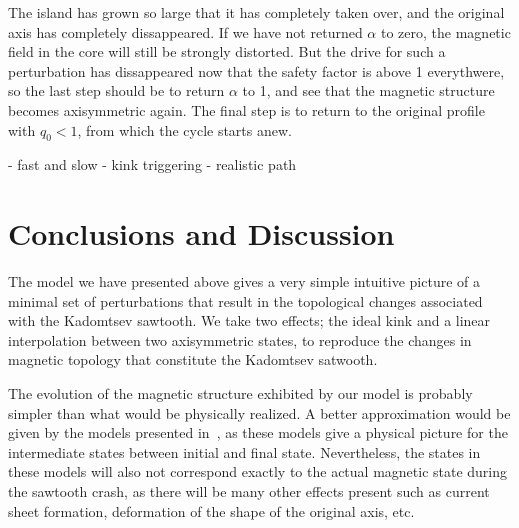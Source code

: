 \documentclass[%
superscriptaddress,
amsmath,amssymb,
aps,
pre,
floatfix,
]{revtex4-2}
\begin{document}
The island has grown so large that it has completely taken over, and the original axis has completely dissappeared. 
If we have not returned $\alpha$ to zero, the magnetic field in the core will still be strongly distorted. 
But the drive for such a perturbation has dissappeared now that the safety factor is above 1 everythwere, so the last step should be to return $\alpha$ to 1, and see that the magnetic structure becomes axisymmetric again. 
The final step is to return to the original profile with $q_0<1$, from which the cycle starts anew. 

- fast and slow
- kink triggering
- realistic path

\section*{Conclusions and Discussion}
The model we have presented above gives a very simple intuitive picture of a minimal set of perturbations that result in the topological changes associated with the Kadomtsev sawtooth. 
We take two effects; the ideal kink and a linear interpolation between two axisymmetric states, to reproduce the changes in magnetic topology that constitute the Kadomtsev satwooth. 


The evolution of the magnetic structure exhibited by our model is probably simpler than what would be physically realized. 
A better approximation would be given by the models presented in~\cite{kolesnichenko1996theory, jaulmes2014redistribution}, as these models give a physical picture for the intermediate states between initial and final state. 
Nevertheless, the states in these models will also not correspond exactly to the actual magnetic state during the sawtooth crash, as there will be many other effects present such as current sheet formation, deformation of the shape of the original axis, etc.




\end{document}
